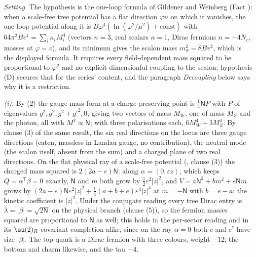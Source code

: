 \emph{Setting.} The hypothesis is the one-loop formula of Gildener and Weinberg (Fact ): when a scale-free tree potential has a flat direction $\varphi\hat{n}$ on which it vanishes, the one-loop potential along it is $B\varphi^{4}(\ln(\varphi^{2}/\mu^{2}) + \text{const})$ with $64\pi^{2}B v^{4} = \sum_{i}n_{i}M_{i}^{4}$ (vectors $n = 3$, real scalars $n = 1$, Dirac fermions $n = -4N_{c}$, masses at $\varphi = v$), and its minimum gives the scalon mass $m_{S}^{2} = 8Bv^{2}$, which is the displayed formula. It requires every field-dependent mass squared to be proportional to $\varphi^{2}$ and no explicit dimensionful coupling to the scalon; hypothesis (D) secures that for the series' content, and the paragraph \emph{Decoupling} below says why it is a restriction.

\emph{(i).} By (2) the gauge mass form at a charge-preserving point is $\tfrac14 \mathsf{N} P$ with $P$ of eigenvalues $g^{2}, g^{2}, g^{2} + g'^{2}, 0$, giving two vectors of mass $M_{W}$, one of mass $M_{Z}$ and the photon, all with $M^{2} \propto \mathsf{N}$; with three polarisations each, $6M_{W}^{4} + 3M_{Z}^{4}$. By clause (3) of the same result, the six real directions on the locus are three gauge directions (eaten, massless in Landau gauge, no contribution), the neutral mode (the scalon itself, absent from the sum) and a charged plane of two real directions. On the flat physical ray of a scale-free potential (, clause (3)) the charged mass squared is $2(2a - e)\mathsf{N}$: along $\alpha = (0, \varepsilon z)$, which keeps $Q = \alpha^{\mathsf T}\beta = 0$ exactly, $\mathsf{N}$ and $m$ both grow by $\tfrac12\varepsilon^{2}|z|^{2}$, and $V = a\mathsf{N}^{2} + bm^{2} + e\mathsf{N}m$ grows by $(2a - e)\mathsf{N}\varepsilon^{2}|z|^{2} + \tfrac14(a + b + e)\varepsilon^{4}|z|^{4}$ at $m = -\mathsf{N}$ with $b = e - a$; the kinetic coefficient is $|z|^{2}$. Under the conjugate reading every tree Dirac entry is $\lambda = |\beta| = \sqrt{2\mathsf{N}}$ on the physical branch (clause (5)), so the fermion masses squared are proportional to $\mathsf{N}$ as well; this holds in the per-sector reading and in its $\su(2)_{R}$-covariant completion alike, since on the ray $\alpha = 0$ both $c$ and $c^{*}$ have size $|\beta|$. The top quark is a Dirac fermion with three colours, weight $-12$; the bottom and charm likewise, and the tau $-4$.

